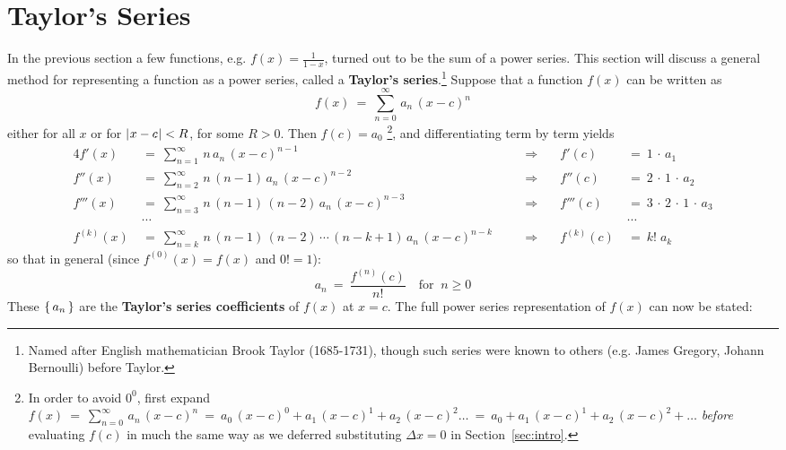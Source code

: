 \section{Taylor's Series}
In the previous section a few functions, e.g. $f(x) = \frac{1}{1-x}$, turned out
to be the sum of a power series. This section will discuss a general method for
representing a function as a power series, called a
\textbf{Taylor's series}.\footnote{Named after English mathematician Brook
Taylor (1685-1731), though such series were known to others (e.g. James Gregory,
Johann Bernoulli) before Taylor.} Suppose that a function $f(x)$ can be written
as
\[
f(x) ~=~ \sum_{n=0}^{\infty}\,a_n\,(x-c)^n
\]
either for all $x$ or for $\lvert\mspace{1mu}x-c\mspace{1mu}\rvert < R$, for some $R>0$. Then $f(c) = a_0$
\!\!\footnote{In order to avoid $0^0$, first expand $f(x) ~=~
\sum_{n=0}^{\infty}\,a_n\,(x-c)^n ~=\allowbreak~ a_0\,(x-c)^0 +
a_1\,(x-c)^1 + a_2\,(x-c)^2 \dots ~=\allowbreak~ a_0 + a_1\,(x-c)^1 +
a_2\,(x-c)^2 + \dots $ \emph{before} evaluating $f(c)$ in much the
same way as we deferred substituting $\Delta x = 0$ in
Section~\ref{sec:intro}.},
and differentiating term by term yields
\begin{alignat*}{4}
f'(x) ~&=~ \sum_{n=1}^{\infty}\,n\,a_n\,(x-c)^{n-1} &&\Rightarrow \quad
           &f'(c) ~&=~ 1\,\cdot\,a_1\\[2pt]
f''(x) ~&=~ \sum_{n=2}^{\infty}\,n\,(n-1)\,a_n\,(x-c)^{n-2} &&\Rightarrow \quad
           &f''(c) ~&=~ 2\,\cdot\,1\,\cdot\,a_2\\[2pt]
f'''(x) ~&=~ \sum_{n=3}^{\infty}\,n\,(n-1)\,(n-2)\,a_n\,(x-c)^{n-3} &&\Rightarrow \quad
           &f'''(c) ~&=~ 3\,\cdot\,2\,\cdot\,1\,\cdot\,a_3\\
&\cdots & {} & {} & {} &\cdots\\
f^{(k)}(x) ~&=~ \sum_{n=k}^{\infty}\,n\,(n-1)\,(n-2)\,\cdots\,(n-k+1)\,a_n\,(x-c)^{n-k}
\quad &&\Rightarrow \quad &f^{(k)}(c) ~&=~ k !\;a_k
\end{alignat*}
so that in general (since $f^{(0)}(x) = f(x)$ and $0 ! = 1$):
\begin{equation}\label{eqn:taylorcoeff}
a_n ~=~ \frac{f^{(n)}(c)}{n !} \quad\text{for $~n \ge 0$}
\end{equation}
These $\left\lbrace\mspace{3mu}a_n\mspace{3mu}\right\rbrace$ are the \textbf{Taylor's series coefficients} of $f(x)$ at
$x=c$. The full power series representation of $f(x)$ can now be stated:

